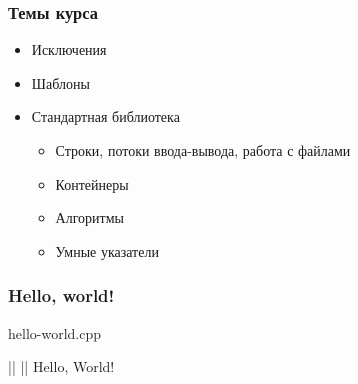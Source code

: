\documentclass[compress]{beamer}
\begin{document}
\begin{frame}

    \frametitle{Темы курса}

    \begin{itemize}

        \item Исключения

        \item Шаблоны

        \item Стандартная библиотека

            \begin{itemize}

                \item Строки, потоки ввода-вывода, работа с файлами

                \item Контейнеры

                \item Алгоритмы

                \item Умные указатели

            \end{itemize}

    \end{itemize}

\end{frame}

\begin{frame}[fragile]

    \frametitle{Hello, world!}

        {hello-world.cpp}

    \begin{terminalwindow}[||]
||
||
Hello, World!
    \end{terminalwindow}

\end{frame}
\end{document}
